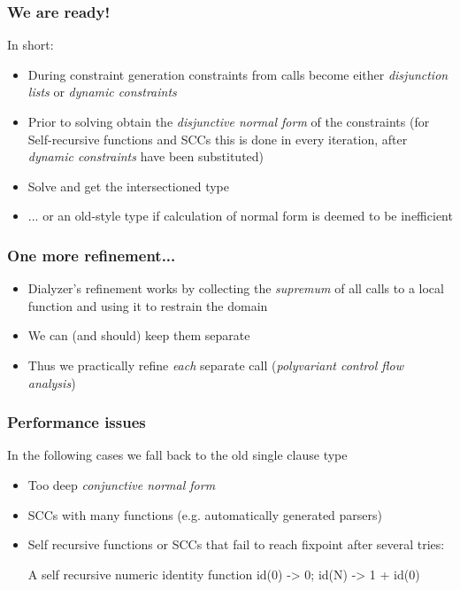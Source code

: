 \documentclass{beamer}
\begin{document}
\begin{frame}
  \frametitle{We are ready!}
  In short: \pause
  \begin{itemize}
  \item During constraint generation constraints from calls become
    either \emph{disjunction lists} or \emph{dynamic constraints} \pause
  \item Prior to solving obtain the \emph{disjunctive normal form} of
    the constraints (for Self-recursive functions and SCCs this is
    done in every iteration, after \emph{dynamic constraints} have
    been substituted) \pause
  \item Solve and get the intersectioned type \pause
  \item ... or an old-style type if calculation of normal form is
    deemed to be inefficient
  \end{itemize}
\end{frame}

\begin{frame}
  \frametitle{One more refinement...}
  \begin{itemize}
  \item Dialyzer's refinement works by collecting the
    \emph{supremum} of all calls to a local function and
    using it to restrain the domain \pause
  \item We can (and should) keep them separate \pause
  \item Thus we practically refine \emph{each} separate
    call (\emph{polyvariant control flow analysis})
  \end{itemize}
\end{frame}

\begin{frame}[fragile]
  \frametitle{Performance issues}
  In the following cases we fall back to the old single clause type
  \begin{itemize}
    \item Too deep \emph{conjunctive normal form}
    \item SCCs with many functions (e.g. automatically generated
      parsers)
    \item Self recursive functions or SCCs that fail to reach fixpoint
      after several tries:
\begin{code}{A self recursive numeric identity function}
    id(0) -> 0; id(N) -> 1 + id(0)
\end{code}
  \end{itemize}
\end{frame}
\end{document}

